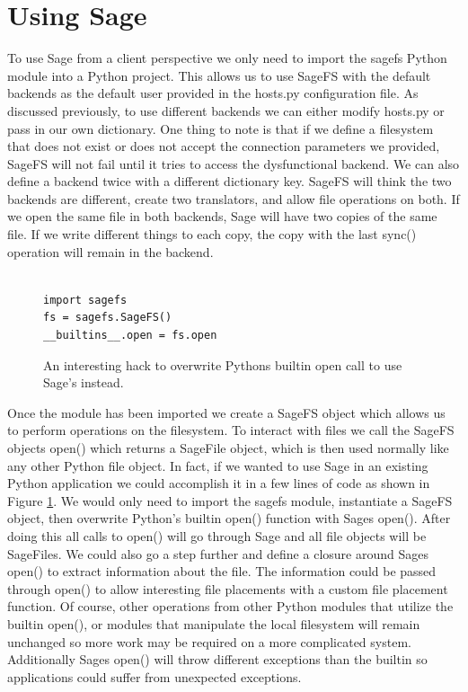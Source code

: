 \section{Using Sage}

To use Sage from a client perspective we only need to import the sagefs Python module into a Python project. This allows us to use SageFS with the default backends as the default user provided in the hosts.py configuration file. As discussed previously, to use different backends we can either modify hosts.py or pass in our own dictionary. One thing to note is that if we define a filesystem that does not exist or does not accept the connection parameters we provided, SageFS will not fail until it tries to access the dysfunctional backend. We can also define a backend twice with a different dictionary key. SageFS will think the two backends are different, create two translators, and allow file operations on both. If we open the same file in both backends, Sage will have two copies of the same file. If we write different things to each copy, the copy with the last sync() operation will remain in the backend.

\begin{figure}[h]
\begin{lstlisting}

import sagefs
fs = sagefs.SageFS()
__builtins__.open = fs.open

\end{lstlisting}
\caption[Builtin Open Overwrite]{An interesting hack to overwrite Pythons builtin open call to use Sage's instead.}
\label{fig:sagepythonhack}
\end{figure}

Once the module has been imported we create a SageFS object which allows us to perform operations on the filesystem. To interact with files we call the SageFS objects open() which returns a SageFile object, which is then used normally like any other Python file object. In fact, if we wanted to use Sage in an existing Python application we could accomplish it in a few lines of code as shown in Figure \ref{fig:sagepythonhack}. We would only need to import the sagefs module, instantiate a SageFS object, then overwrite Python's builtin open() function with Sages open(). After doing this all calls to open() will go through Sage and all file objects will be SageFiles. We could also go a step further and define a closure around Sages open() to extract information about the file. The information could be passed through open() to allow interesting file placements with a custom file placement function. Of course, other operations from other Python modules that utilize the builtin open(), or modules that manipulate the local filesystem will remain unchanged so more work may be required on a more complicated system. Additionally Sages open() will throw different exceptions than the builtin so applications could suffer from unexpected exceptions.

